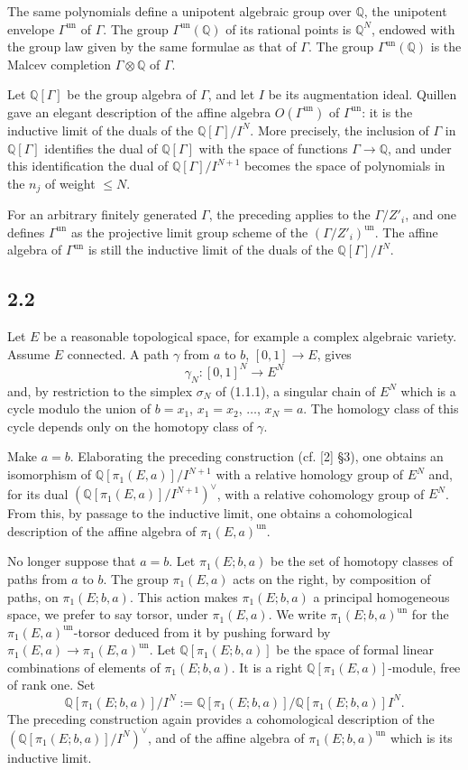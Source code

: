 \documentclass[11pt]{article}
\newcommand{\Q}{\mathbb Q}
\begin{document}
The same polynomials define a unipotent algebraic group over $\Q$, the unipotent envelope $\Gamma^{\mathrm{un}}$ of $\Gamma$.
The group $\Gamma^{\mathrm{un}}(\Q)$ of its rational points is $\Q^N$, endowed with the group law given by the same formulae as that of $\Gamma$.
The group $\Gamma^{\mathrm{un}}(\Q)$ is the Malcev completion $\Gamma\otimes\Q$ of $\Gamma$.

Let $\Q[\Gamma]$ be the group algebra of $\Gamma$, and let $I$ be its augmentation ideal.
Quillen gave an elegant description of the affine algebra $O(\Gamma^{\mathrm{un}})$ of $\Gamma^{\mathrm{un}}$: it is the inductive limit of the duals of the $\Q[\Gamma]/I^N$.
More precisely, the inclusion of $\Gamma$ in $\Q[\Gamma]$ identifies the dual of $\Q[\Gamma]$ with the space of functions $\Gamma\to\Q$, and under this identification the dual of $\Q[\Gamma]/I^{N+1}$ becomes the space of polynomials in the $n_j$ of weight $\leq N$.

For an arbitrary finitely generated $\Gamma$, the preceding applies to the $\Gamma/Z'_i$, and one defines $\Gamma^{\mathrm{un}}$ as the projective limit group scheme of the $(\Gamma/Z'_i)^{\mathrm{un}}$.
The affine algebra of $\Gamma^{\mathrm{un}}$ is still the inductive limit of the duals of the $\Q[\Gamma]/I^N$.

\subsection*{2.2}
Let $E$ be a reasonable topological space, for example a complex algebraic variety.
Assume $E$ connected.
A path $\gamma$ from $a$ to $b$, $[0,1]\to E$, gives
\[
 \gamma_N:[0,1]^N\to E^N
\]
and, by restriction to the simplex $\sigma_N$ of (1.1.1), a singular chain of $E^N$ which is a cycle modulo the union of $b=x_1$, $x_1=x_2$, $\ldots$, $x_N=a$.
The homology class of this cycle depends only on the homotopy class of $\gamma$.

Make $a=b$.
Elaborating the preceding construction (cf. [2] \S3), one obtains an isomorphism of $\Q[\pi_1(E,a)]/I^{N+1}$ with a relative homology group of $E^N$ and, for its dual $(\Q[\pi_1(E,a)]/I^{N+1})^\vee$, with a relative cohomology group of $E^N$.
From this, by passage to the inductive limit, one obtains a cohomological description of the affine algebra of $\pi_1(E,a)^{\mathrm{un}}$.

No longer suppose that $a=b$.
Let $\pi_1(E;b,a)$ be the set of homotopy classes of paths from $a$ to $b$.
The group $\pi_1(E,a)$ acts on the right, by composition of paths, on $\pi_1(E;b,a)$.
This action makes $\pi_1(E;b,a)$ a principal homogeneous space, we prefer to say torsor, under $\pi_1(E,a)$.
We write $\pi_1(E;b,a)^{\mathrm{un}}$ for the $\pi_1(E,a)^{\mathrm{un}}$-torsor deduced from it by pushing forward by $\pi_1(E,a)\to\pi_1(E,a)^{\mathrm{un}}$.
Let $\Q[\pi_1(E;b,a)]$ be the space of formal linear combinations of elements of $\pi_1(E;b,a)$.
It is a right $\Q[\pi_1(E,a)]$-module, free of rank one.
Set
\[
 \Q[\pi_1(E;b,a)]/I^N
 :=\Q[\pi_1(E;b,a)]/\Q[\pi_1(E;b,a)]I^N.
\]
The preceding construction again provides a cohomological description of the $(\Q[\pi_1(E;b,a)]/I^N)^\vee$, and of the affine algebra of $\pi_1(E;b,a)^{\mathrm{un}}$ which is its inductive limit.
\end{document}
